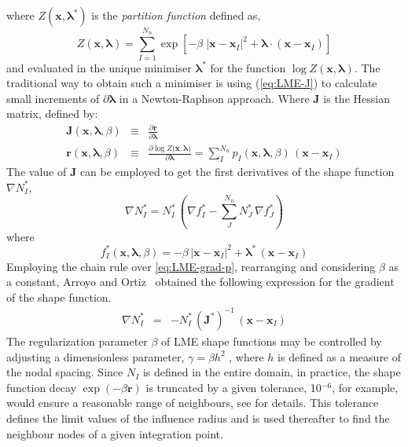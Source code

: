 \message{ !name(2020_EFM_MPM_Eigensoftening.tex)}\documentclass[preprint,12pt,a4paper]{elsarticle}
\newcommand{\vec}[1]{
  \ensuremath{\mathbf{{#1}}}
}
\newcommand{\tens}[1]{
  \ensuremath{\mathbf{{#1}}}
}
\begin{document}
where $Z(\vec{x},\vec{\lambda}^*)$ is the \textit{partition function} defined as,
\begin{equation}
  \label{eq:LME-Z}
Z(\vec{x}, {\vec{\lambda}}) = \sum_{I=1}^{N_n}{ \exp \left[ -\beta \; |\vec{x}-\vec{x}_I|^2 + \vec{\lambda} \cdot (\vec{x}-\vec{x}_I)  \right]}
\end{equation}
and evaluated in the unique minimiser $\vec{\lambda}^*$ for the function $\log
Z(\vec{x}, \vec{\lambda})$. The traditional way to obtain
such a minimiser is using (\ref{eq:LME-J}) to calculate small
increments of $\partial\vec{\lambda}$ in a Newton-Raphson
approach. Where $\tens{J}$ is the Hessian matrix, defined by:
\begin{eqnarray}
  \label{eq:LME-J} 
  \tens{J}(\vec{x}, \vec{\lambda},\beta) &\equiv& \frac{\partial
                                                  \vec{r}}{\partial \vec{\lambda}}\\
  \label{eq:LME-r}
  \vec{r}(\vec{x},\vec{\lambda},\beta) &\equiv& \frac{\partial \log{ Z(   \vec{x},\vec{\lambda}})}{\partial \vec{\lambda}}  = \sum_I^{N_n} p_I(\vec{x},\vec{\lambda},\beta) \, (\vec{x} - \vec{x}_I)
\end{eqnarray}
The value of $\tens{J}$ can be employed to get the first derivatives of the shape function $\nabla
N^*_I$,
\begin{equation}
  \label{eq:LME-grad-p}
\nabla N^*_I = N^*_I  \, \left(\nabla f^*_I-\sum_J^{N_n} N^*_J \, \nabla f^*_J\right)
\end{equation}
where
\begin{equation}
  \label{eq:LME-f}
f^*_I(\vec{x},  \vec{\lambda},\beta)=-\beta \, |\vec{x}-\vec{x}_I|^2 + \vec{\lambda}^*  \,  (\vec{x}-\vec{x}_I)
\end{equation}
Employing the chain rule over \eqref{eq:LME-grad-p}, rearranging and considering $\beta$ as a
constant, Arroyo and Ortiz~\cite{Arroyo2006} obtained the following
expression for the gradient of the shape function.
\begin{eqnarray}
  \label{eq:LME-gradp} 
\nabla N^*_I &=& -N^*_I \,  (\tens{J}^*)^{-1} \,  (\vec{x} - \vec{x}_I)
\end{eqnarray}
The regularization parameter $\beta$ of LME shape functions may be
controlled by adjusting a dimensionless parameter, $\gamma=\beta h^2$
\cite{Arroyo2006}, where $h$ is defined as a measure of the nodal
spacing. Since  $N_I$ is defined in the entire domain, in practice,
the shape function decay $\exp(-\beta \vec{r} )$ is truncated  by  a
given tolerance, 10$^{-6}$, for example,  would ensure a reasonable
range of neighbours, see \cite{Arroyo2006} for details. This tolerance defines
the limit values of the influence radius and is used thereafter to
find the neighbour nodes of a given integration point.
\end{document}
